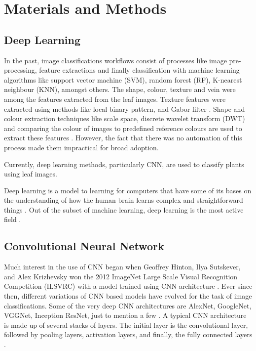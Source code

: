 \documentclass[conference]{IEEEtran}
\begin{document}
\section{Materials and Methods}


\subsection{Deep Learning}\label{AA}

In the past, image classifications workflows consist of processes like image pre-processing, feature extractions and finally classification with machine learning algorithms like support vector machine (SVM), random forest (RF), K-nearest neighbour (KNN), amongst others. The shape, colour, texture and vein were among the features extracted from the leaf images. Texture features were extracted using methods like local binary pattern, and Gabor filter  \cite{guo2010completed, li2010selection}. Shape and colour extraction techniques like scale space, discrete wavelet transform (DWT) and comparing the colour of images to predefined reference colours are used to extract these features \cite{satpute2016color}. However, the fact that there was no automation of this process made them impractical for broad adoption.

Currently, deep learning methods, particularly CNN, are used to classify plants using leaf images.


Deep learning is a model to learning for computers that have some of its bases on the understanding of how the human brain learns complex and straightforward things \cite{wang2017origin}.
Out of the subset of machine learning, deep learning is the most active field \cite{angermueller2016deep}.

\subsection{Convolutional Neural Network}
Much interest in the use of CNN began when Geoffrey Hinton, Ilya Sutskever, and Alex Krizhevsky won the 2012 ImageNet Large Scale Visual Recognition Competition (ILSVRC) with a model trained using CNN architecture \cite{russakovsky2015imagenet}. Ever since then, different variations of CNN based models have evolved for the task of image classifications. Some of the very deep CNN architectures are AlexNet, GoogleNet, VGGNet, Inception ResNet, just to mention a few \cite{szegedy2013intriguing, simonyan2014very, szegedy2017inception}. A typical CNN architecture is made up of several stacks of layers. The initial layer is the convolutional layer, followed by pooling layers, activation layers, and finally, the fully connected layers \cite{}.
\end{document}
